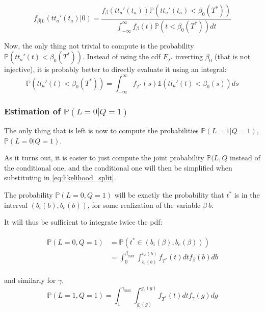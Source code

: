 \documentclass{article}
\begin{document}
\begin{equation*}
  f_{\beta | L}(tt_a'(t_a) | 0) = \frac{f_\beta(tt_a'(t_a))\mathbb{P}(tt_a'(t_a) < \beta_0(T^*))}{\int_{-\infty}^\infty f_\beta(t)\mathbb{P}(t < \beta_0(T^*)) dt}
\end{equation*}

Now, the only thing not trivial to compute is the probability \(\mathbb{P}(tt_a'(t) < \beta_0(T^*))\).
Instead of using the cdf \(F_{T^*}\) inverting \(\beta_0\) (that is not injective), it is probably better to directly evaluate it using an integral:
\begin{equation*}
  \mathbb{P}(tt_a'(t) < \beta_0(T^*)) = \int_{-\infty}^\infty f_{T^*}(s) \mathbb{1}(tt_a'(t) < \beta_0(s)) ds
\end{equation*}

\subsubsection{Estimation of $\mathbb{P}(L=0 | Q=1)$}

The only thing that is left is now to compute the probabilities \(\mathbb{P}(L=1 | Q=1)\), \(\mathbb{P}(L=0 | Q=1)\).

As it turns out, it is easier to just compute the joint probability \(\mathbb{P}(L, Q\) instead of the conditional one, and the conditional one will then be simplified when substituting in \eqref{eq:likelihood_split}.

The probability \(\mathbb{P}(L=0, Q=1)\) will be exactly the probability that \(t^*\) is in the interval \((b_i(b), b_e(b))\), for some realization of the variable \(\beta\ b\).

It will thus be sufficient to integrate twice the pdf:

\begin{align}
  \label{eq:prob_int_beta}
  \begin{split}
    \mathbb{P}(L=0, Q=1) & =\mathbb{P}(t^* \in (b_i(\beta), b_e(\beta))) \\
    & = \int_0^{\beta_\text{max}}\int_{b_i(b)}^{b_e(b)} f_{T^*}(t)dtf_\beta(b)db
      \end{split}
\end{align}

and similarly for \(\gamma\),
\begin{equation}
  \label{eq:prob_in_gamma}
  \mathbb{P}(L=1, Q=1) = \int_1^{\gamma_\text{max}}\int_{g_i(g)}^{g_e(g)} f_{T^*}(t)dtf_\gamma(g)dg
\end{equation}
\end{document}
